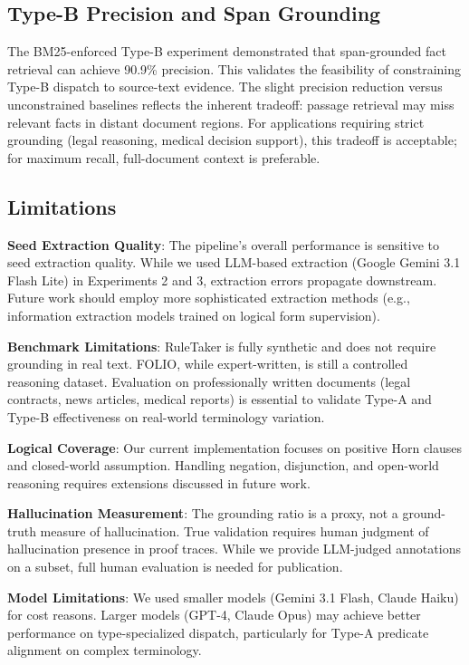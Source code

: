 \documentclass[11pt,letterpaper]{article}
\begin{document}
\subsection{Type-B Precision and Span Grounding}

The BM25-enforced Type-B experiment demonstrated that span-grounded fact retrieval can achieve 90.9\% precision. This validates the feasibility of constraining Type-B dispatch to source-text evidence. The slight precision reduction versus unconstrained baselines reflects the inherent tradeoff: passage retrieval may miss relevant facts in distant document regions. For applications requiring strict grounding (legal reasoning, medical decision support), this tradeoff is acceptable; for maximum recall, full-document context is preferable.

\subsection{Limitations}

\textbf{Seed Extraction Quality}: The pipeline's overall performance is sensitive to seed extraction quality. While we used LLM-based extraction (Google Gemini 3.1 Flash Lite) in Experiments 2 and 3, extraction errors propagate downstream. Future work should employ more sophisticated extraction methods (e.g., information extraction models trained on logical form supervision).

\textbf{Benchmark Limitations}: RuleTaker is fully synthetic and does not require grounding in real text. FOLIO, while expert-written, is still a controlled reasoning dataset. Evaluation on professionally written documents (legal contracts, news articles, medical reports) is essential to validate Type-A and Type-B effectiveness on real-world terminology variation.

\textbf{Logical Coverage}: Our current implementation focuses on positive Horn clauses and closed-world assumption. Handling negation, disjunction, and open-world reasoning requires extensions discussed in future work.

\textbf{Hallucination Measurement}: The grounding ratio is a proxy, not a ground-truth measure of hallucination. True validation requires human judgment of hallucination presence in proof traces. While we provide LLM-judged annotations on a subset, full human evaluation is needed for publication.

\textbf{Model Limitations}: We used smaller models (Gemini 3.1 Flash, Claude Haiku) for cost reasons. Larger models (GPT-4, Claude Opus) may achieve better performance on type-specialized dispatch, particularly for Type-A predicate alignment on complex terminology.
\end{document}
